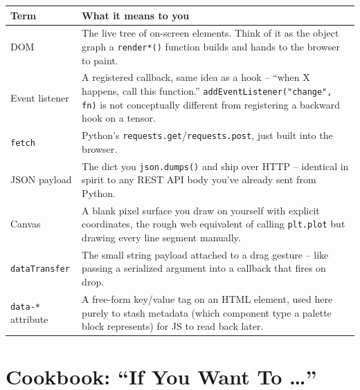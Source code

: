 \documentclass[11pt]{article}
\begin{document}
\begin{center}
\begin{tabular}{@{}p{}p{}@{}}
\toprule
\textbf{Term} & \textbf{What it means to you} \\
\midrule
DOM & The live tree of on-screen elements. Think of it as the object graph a
\lstinline{render*()} function builds and hands to the browser to paint. \\
Event listener & A registered callback, same idea as a hook -- ``when X
happens, call this function.'' \lstinline{addEventListener("change", fn)}
is not conceptually different from registering a backward hook on a tensor. \\
\lstinline{fetch} & Python's \lstinline{requests.get}/\lstinline{requests.post},
just built into the browser. \\
JSON payload & The dict you \lstinline{json.dumps()} and ship over HTTP --
identical in spirit to any REST API body you've already sent from Python. \\
Canvas & A blank pixel surface you draw on yourself with explicit coordinates,
the rough web equivalent of calling \lstinline{plt.plot} but drawing every
line segment manually. \\
\lstinline{dataTransfer} & The small string payload attached to a drag
gesture -- like passing a serialized argument into a callback that fires on
drop. \\
\lstinline{data-*} attribute & A free-form key/value tag on an HTML element,
used here purely to stash metadata (which component type a palette block
represents) for JS to read back later. \\
\bottomrule
\end{tabular}
\end{center}

\section{Cookbook: ``If You Want To \ldots''}
\end{document}
